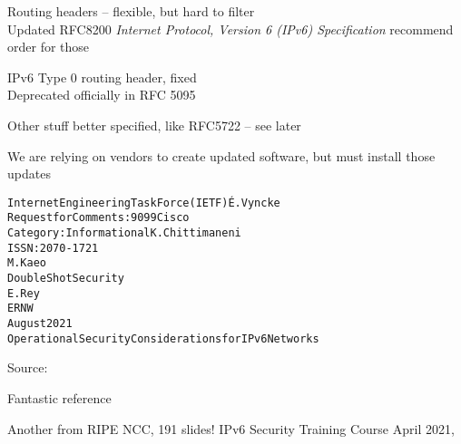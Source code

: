 \documentclass[Screen16to9,17pt]{foils}
\begin{document}
\begin{list2}
\item Routing headers -- flexible, but hard to filter\\
Updated RFC8200 \emph{Internet Protocol, Version 6 (IPv6) Specification} recommend order for those
\item IPv6 Type 0 routing header, fixed\\
Deprecated officially in RFC 5095 
\item Other stuff better specified, like RFC5722 -- see later
\end{list2}

We are relying on vendors to create updated software, but must install those updates




\begin{alltt}\small
Internet Engineering Task Force (IETF)                         É. Vyncke
Request for Comments: 9099                                         Cisco
Category: Informational                                  K. Chittimaneni
ISSN: 2070-1721
                                                                 M. Kaeo
                                                    Double Shot Security
                                                                  E. Rey
                                                                    ERNW
                                                             August 2021
         Operational Security Considerations for IPv6 Networks
\end{alltt}
Source: 

\begin{list2}
\item Fantastic reference
\item Another from RIPE NCC, 191 slides! IPv6 Security Training Course April 2021,\\
\end{list2}



\end{document}
